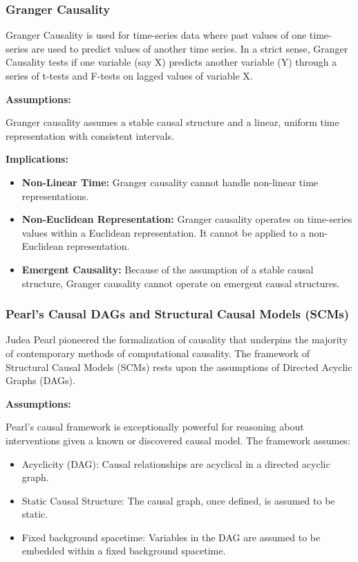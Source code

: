 \subsubsection*{Granger Causality}

Granger Causality \cite{granger1969causal} is used for time-series data where past values of one time-series are used to predict values of another time series. In a strict sense, Granger Causality tests if one variable (say X) predicts another variable (Y) through a series of t-tests and F-tests on lagged values of variable X.

\textbf{Assumptions:}

Granger causality assumes a stable causal structure and a linear, uniform time representation with consistent intervals.

\newpage

\textbf{Implications:}

\begin{itemize}
    \item \textbf{Non-Linear Time:} Granger causality cannot handle non-linear time representations.
    \item \textbf{Non-Euclidean Representation:} Granger causality operates on time-series values within a Euclidean representation. It cannot be applied to a non-Euclidean representation.
    \item \textbf{Emergent Causality:} Because of the assumption of a stable causal structure, Granger causality cannot operate on emergent causal structures.
\end{itemize}


\subsubsection*{Pearl's Causal DAGs and Structural Causal Models (SCMs)}

Judea Pearl pioneered the formalization of causality that underpins the majority of contemporary methods of computational causality. The framework of Structural Causal Models \cite{pearl2000causality} (SCMs) rests upon the assumptions of Directed Acyclic Graphs (DAGs).

\textbf{Assumptions:}

Pearl's causal framework is exceptionally powerful for reasoning about interventions given a known or discovered causal model.
The framework assumes: 

\begin{itemize}
    \item Acyclicity (DAG): Causal relationships are acyclical in a directed acyclic graph.
    \item Static Causal Structure: The causal graph, once defined, is assumed to be static.
    \item Fixed background spacetime: Variables in the DAG are assumed to be embedded within a fixed background spacetime.
\end{itemize}


